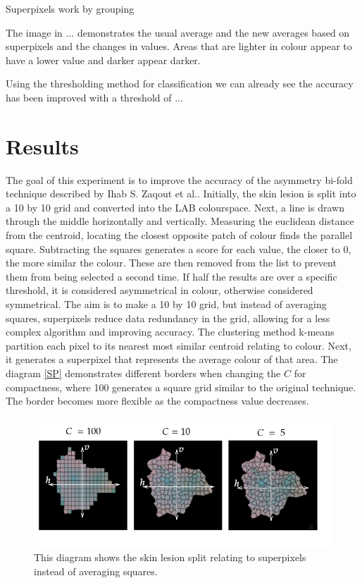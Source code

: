 Superpixels work by grouping

The image in ... demonstrates the usual average and the new averages based on superpixels and the changes in values. Areas that are lighter in colour appear to have a lower value and darker appear darker.

Using the thresholding method for classification we can already see the accuracy has been improved with a threshold of ...

\section{Results}
The goal of this experiment is to improve the accuracy of the asymmetry bi-fold technique described by Ihab S. Zaqout et al.\cite{Zaqout2016}. Initially, the skin lesion is split into a 10 by 10 grid and converted into the LAB colourspace. Next, a line is drawn through the middle horizontally and vertically. Measuring the euclidean distance from the centroid, locating the closest opposite patch of colour finds the parallel square. Subtracting the squares generates a score for each value, the closer to 0, the more similar the colour. These are then removed from the list to prevent them from being selected a second time. If half the results are over a specific threshold, it is considered asymmetrical in colour, otherwise considered symmetrical. The aim is to make a 10 by 10 grid, but instead of averaging squares, superpixels reduce data redundancy in the grid, allowing for a less complex algorithm and improving accuracy. The clustering method k-means partition each pixel to its nearest most similar centroid relating to colour. Next, it generates a superpixel that represents the average colour of that area. The diagram \ref{SP} demonstrates different borders when changing the $C$ for compactness, where 100 generates a square grid similar to the original technique. The border becomes more flexible as the compactness value decreases.

\begin{figure} 
\centering
\includegraphics[scale=0.6]{images/superpixels.png}
\caption{This diagram shows the skin lesion split relating to superpixels instead of averaging squares.}
\end{figure} \label{SP}

